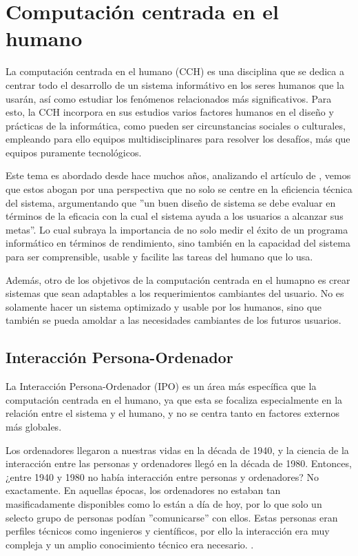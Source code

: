 \section{Computación centrada en el humano}

La computación centrada en el humano (CCH) es una disciplina que se dedica a  centrar todo el desarrollo de un sistema informátivo en los seres humanos que la usarán, así como estudiar los fenómenos relacionados más significativos. Para esto, la CCH incorpora en sus estudios varios factores humanos en el diseño y prácticas de la informática, como pueden ser circunstancias sociales o culturales, empleando para ello equipos multidisciplinares para resolver los desafíos, más que equipos puramente tecnológicos.

Este tema es abordado desde hace muchos años, analizando el artículo de \cite{Card1983ThePO}, vemos que estos abogan por una perspectiva que no solo se centre en la eficiencia técnica del sistema, argumentando que ''un buen diseño de sistema se debe evaluar en términos de la eficacia con la cual el sistema ayuda a los usuarios a alcanzar sus metas''. Lo cual subraya la importancia de no solo medir el éxito de un programa informático en términos de rendimiento, sino también en la capacidad del sistema para ser comprensible, usable y facilite las tareas del humano que lo usa.

Además, otro de los objetivos de la computación centrada en el humapno es crear sistemas que sean adaptables a los requerimientos cambiantes del usuario. No es solamente hacer un sistema optimizado y usable por los humanos, sino que también se pueda amoldar a las necesidades cambiantes de los futuros usuarios.

\subsection{Interacción Persona-Ordenador }

La Interacción Persona-Ordenador (IPO) es un área más específica que la computación centrada en el humano, ya que esta se focaliza especialmente en la relación entre el sistema y el humano, y no se centra tanto en factores externos más globales.

Los ordenadores llegaron a nuestras vidas en la década de 1940, y la ciencia de la interacción entre las personas y ordenadores llegó en la década de 1980. Entonces, ¿entre 1940 y 1980 no había interacción entre personas y ordenadores? No exactamente. En aquellas épocas, los ordenadores no estaban tan masificadamente disponibles como lo están a día de hoy, por lo que solo un selecto grupo de personas podían ''comunicarse'' con ellos. Estas personas eran perfiles técnicos como ingenieros y científicos, por ello la interacción era muy compleja y un amplio conocimiento técnico era necesario. \citep{mackenzie2012human}.

